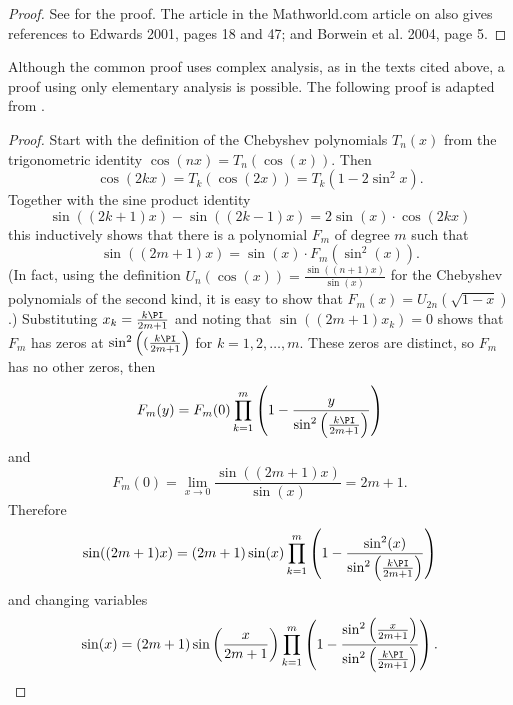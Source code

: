 \documentclass[12pt]{article}
\begin{document}
\begin{proof}
    See
    \cite[page 312]{saks71} for the proof.  The article in the
    Mathworld.com article on 
    also gives references to Edwards 2001, pages 18 and 47; and Borwein
    et al.  2004, page 5.
\end{proof}

Although the common proof uses complex analysis, as in the texts cited
above, a proof using only elementary analysis is possible.  The
following proof is adapted from
\cite{kortram96}.

\begin{proof}
    Start with the definition of the Chebyshev polynomials \( T_n(x) \)
    from the trigonometric identity \( \cos(nx) = T_n( \cos(x) ) \).
    Then
    \[
        \cos( 2kx ) = T_k(\cos(2x)) = T_k(1 - 2 \sin^2 x).
    \] Together with the sine product identity
    \[
        \sin( (2k+1)x) - \sin( (2k-1)x) = 2 \sin(x) \cdot \cos(2kx)
    \] this inductively shows that there is a polynomial \( F_m \) of
    degree \( m \) such that
    \[
        \sin( (2m+1)x ) = \sin(x) \cdot F_m(\sin^2(x)).
    \] (In fact, using the definition \( U_n(\cos(x)) = \frac{\sin((n+1)x)}
    {\sin(x)} \) for the Chebyshev polynomials of the second kind, it is
    easy to show that \( F_m(x) = U_{2n}(\sqrt{1-x}) \).) Substituting \(
    x_k = \frac{k\PI}{2m+1} \) and noting that \( \sin((2m+1)x_k) = 0 \)
    shows that \( F_m \) has zeros at \( \sin^2\left((\frac{k\PI}{2m+1}
    \right) \) for \( k = 1,2,\dots,m \).  These zeros are distinct, so \(
    F_m \) has no other zeros, then
    \[
        F_m(y) = F_m(0) \prod_{k=1}^{m} \left( 1 - \frac{y}{\sin^2\left(\frac
        {k\PI}{2m+1}\right)} \right)
    \] and
    \[
        F_m(0) = \lim_{x \to 0 } \frac{\sin( (2m+1)x)}{\sin(x)} = 2m+1.
    \] Therefore
    \[
        \sin( (2m+1)x) = (2m+1) \sin(x) \prod_{k=1}^{m} \left( 1 - \frac
        {\sin^2 (x)}{\sin^2\left(\frac{k\PI}{2m+1}\right)} \right)
    \] and changing variables
    \begin{equation}
        \label{eq:wallisformula:sineprod} \sin(x) = (2m+1) \sin\left(
        \frac{x}{2m+1} \right) \prod_{k=1}^{m} \left( 1 - \frac{\sin^2\left
        (\frac{x}{2m+1}\right)}{\sin^2\left( \frac{k\PI}{2m+1}\right)}
        \right).
    \end{equation}


\end{proof}
\end{document}

